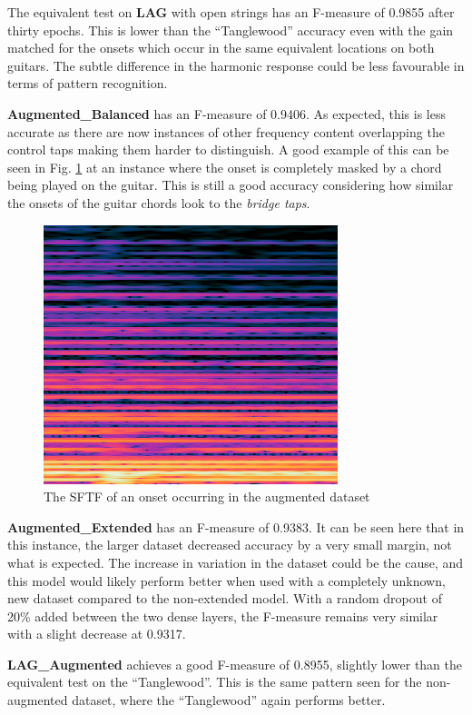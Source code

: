 \documentclass[conference]{IEEEtran}
\begin{document}
The equivalent test on \textbf{LAG} with open strings has an F-measure of 0.9855 after thirty epochs. This is lower than the ``Tanglewood'' accuracy even with the gain matched for the onsets which occur in the same equivalent locations on both guitars. The subtle difference in the
harmonic response could be less favourable in terms of pattern recognition.

\textbf{Augmented\_Balanced} has an F-measure of 0.9406. As expected, this is less accurate as there are now instances of other frequency content overlapping the control taps making them harder
to distinguish. A good example of this can be seen in Fig. \ref{augmented-bridge} at an instance where the onset is completely masked by a chord being played on the guitar. This is still a good accuracy considering how similar the onsets of the guitar chords
look to the \emph{bridge taps}.

\begin{figure}[htbp]
    \centerline{\includegraphics[scale=0.4]{augmented-bridge.png}}
    \caption{The SFTF of an onset occurring in the augmented dataset}
    \label{augmented-bridge}
    \end{figure}


\textbf{Augmented\_Extended} has an F-measure of 0.9383. It can be seen here that in this instance, the larger dataset decreased accuracy by a very small margin, not what is expected. The increase in variation in the
dataset could be the cause, and this model would likely perform better when used with a completely unknown, new dataset compared to the non-extended model.
With a random dropout of 20\% added between the two dense layers, the F-measure remains very similar with a slight decrease at 0.9317.

\textbf{LAG\_Augmented} achieves a good F-measure of 0.8955, slightly lower than the equivalent test on the ``Tanglewood''. This is the same pattern seen for the non-augmented dataset, where the ``Tanglewood'' again performs better.
\end{document}

